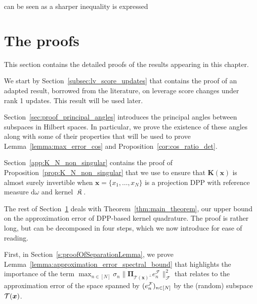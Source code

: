 \documentclass[twoside,11pt]{book}
\numberwithin{theorem}{chapter}
\numberwithin{definition}{chapter}
\numberwithin{proposition}{chapter}
\numberwithin{corollary}{chapter}
\numberwithin{example}{chapter}
\numberwithin{lemma}{chapter}
\numberwithin{assumption}{chapter}
\DeclareMathOperator*{\KDPP}{\mathfrak{K}}
\begin{document}
can be seen as a sharper inequality is expressed 


\label{subsec:dpp_quadrature_error_strong}




\section{The proofs}
\label{s:proofs}
This section contains the detailed proofs of the results appearing in this chapter. 

We start by Section~\ref{subsec:lv_score_updates} that  contains the proof of an adapted result, borrowed from the literature, on leverage score changes under rank 1 updates. This result will be used later.

Section~\ref{sec:proof_principal_angles}  introduces the principal angles between subspaces in Hilbert spaces. In particular, we prove the existence of these angles along with some of their properties that will be used to prove Lemma~\ref{lemma:max_error_cos} and Proposition~\ref{cor:cos_ratio_det}.

Section~\ref{app:K_N_non_singular} contains the proof of Proposition~\ref{prop:K_N_non_singular} that we use to ensure that $\bm{K}(\bm{x})$ is almost surely invertible when $\bm{x} = \{x_{1}, \dots , x_{N}\}$ is a projection DPP with reference measure $\mathrm{d}\omega$ and kernel $\KDPP$. 


The rest of Section~\ref{s:proofs} deals with Theorem~\ref{thm:main_theorem}, our upper bound on the approximation error of DPP-based kernel quadrature. The proof is rather long, but can be decomposed in four steps, which we now introduce for ease of reading.

First, in Section~\ref{s:proofOfSeparationLemma}, we prove Lemma~\ref{lemma:approximation_error_spectral_bound} that highlights the importance of the term $\max_{n \in [N]} \sigma_{n} \|\bm{\Pi}_{\mathcal{T}(\bm{x})^{\perp}} e_{n}^{\mathcal{F}}\|_{\mathcal{F}}^{2}$ that relates to the approximation error of the space spanned by $(e^{\cal F}_n)_{n\in[N]}$ by the (random) subspace ${\cal T}(\bm{x})$. 

\end{document}

